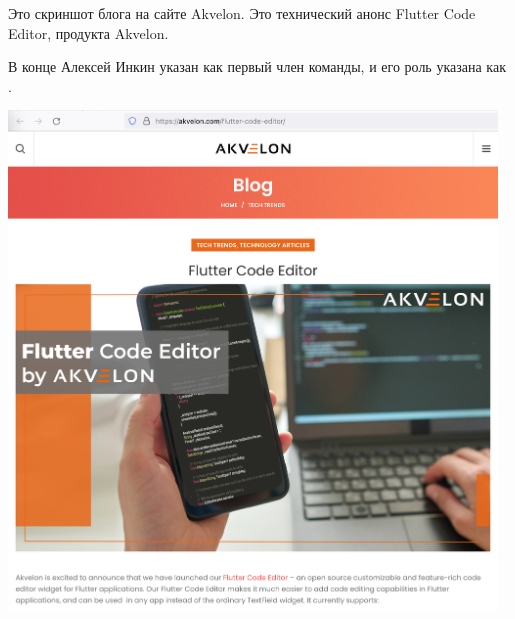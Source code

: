 
Это скриншот блога на сайте Akvelon.
Это технический анонс Flutter Code Editor, продукта Akvelon.

В конце Алексей Инкин указан как первый член команды,
и его роль указана как .

\begin{center}
    \includegraphics[width=35em]{flutter-code-editor-announcement-p1}
\end{center}
\WillContinue
\pagebreak

